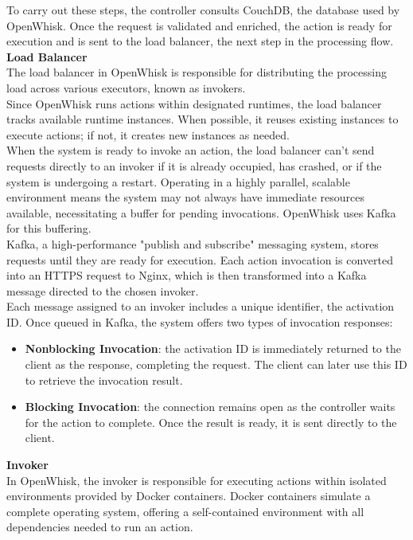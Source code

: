 To carry out these steps, the controller consults CouchDB, the database used by OpenWhisk. Once the request is validated and enriched, the action is ready for execution and is sent to the load balancer, the next step in the processing flow.\vspace{14pt}\\
\textbf{Load Balancer}\\
The load balancer in OpenWhisk is responsible for distributing the processing load across various executors, known as invokers.\\
Since OpenWhisk runs actions within designated runtimes, the load balancer tracks available runtime instances. When possible, it reuses existing instances to execute actions; if not, it creates new instances as needed.\vspace{14pt}\\
When the system is ready to invoke an action, the load balancer can't send requests directly to an invoker if it is already occupied, has crashed, or if the system is undergoing a restart. Operating in a highly parallel, scalable environment means the system may not always have immediate resources available, necessitating a buffer for pending invocations. OpenWhisk uses Kafka for this buffering.\vspace{14pt}\\
Kafka, a high-performance "publish and subscribe" messaging system, stores requests until they are ready for execution. Each action invocation is converted into an HTTPS request to Nginx, which is then transformed into a Kafka message directed to the chosen invoker.\\
Each message assigned to an invoker includes a unique identifier, the activation ID. Once queued in Kafka, the system offers two types of invocation responses:
\begin{itemize}
    \item \textbf{Nonblocking Invocation}: the activation ID is immediately returned to the client as the response, completing the request. The client can later use this ID to retrieve the invocation result.
    \item \textbf{Blocking Invocation}: the connection remains open as the controller waits for the action to complete. Once the result is ready, it is sent directly to the client.
\end{itemize}
\vspace{5pt}
\textbf{Invoker}\\
In OpenWhisk, the invoker is responsible for executing actions within isolated environments provided by Docker containers. Docker containers simulate a complete operating system, offering a self-contained environment with all dependencies needed to run an action.\vspace{14pt}\\
